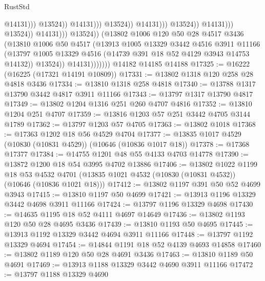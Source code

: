 \begin{lexlean}{RustStd}
\begin{coremodule}
                                                                  @14131)))
                                                            @13524))
                                                        @14131)))
                                                  @13524))
                                              @14131)))
                                        @13524))
                                    @14131)))
                              @13524))
                          @14131)))
                    @13524))
                (@13802
                  @1006
                  @120
                  @50
                  @28
                  @4517
                  @3436
                  (@13810
                    @1006
                    @50
                    @4517
                    (@13913
                      @1005
                      @13329
                      @3442
                      @4516
                      @3911
                      @11166
                      (@13797 @1005 @13329 @4516 (@14739 @391 @18 @52 @4129 @3943 @14753 @14132))
                      @13524))
                  @14131)))))))
    @14182
    @14185
    @14188
@17325 := @16222 (@16225 (@17321 @14191 @10809))
@17331 := @13802 @1318 @120 @258 @28 @4818 @3436
@17334 := @13810 @1318 @258 @4818
@17340 := @13788 @1317 @13790 @3442 @4817 @3911 @11166
@17343 := @13797 @1317 @13790 @4817
@17349 := @13802 @1204 @1316 @251 @260 @4707 @4816
@17352 := @13810 @1204 @251 @4707
@17359 := @13816 @1203 @57 @251 @3442 @4705 @3144 @1789
@17362 := @13797 @1203 @57 @4705
@17363 := @13802 @1018
@17368 := @17363 @1202 @18 @56 @4529 @4704
@17377 := @13835 @1017 @4529 (@10830 (@10831 @4529)) (@10646 (@10836 @1017 @18))
@17378 := @17368 @17377
@17384 := @14755 @1201 @48 @55 @4133 @4703 @14778
@17390 := @13872 @1200 @18 @54 @3995 @4702 @13886
@17406 := @13802
    @1022
    @1199
    @18
    @53
    @4532
    @4701
    (@13835 @1021 @4532 (@10830 (@10831 @4532)) (@10646 (@10836 @1021 @18)))
@17412 := @13802 @1197 @391 @50 @52 @4699 @3943
@17415 := @13810 @1197 @50 @4699
@17421 := @13913 @1196 @13329 @3442 @4698 @3911 @11166
@17424 := @13797 @1196 @13329 @4698
@17430 := @14635 @1195 @18 @52 @4111 @4697 @14649
@17436 := @13802 @1193 @120 @50 @28 @4695 @3436
@17439 := @13810 @1193 @50 @4695
@17445 := @13913 @1192 @13329 @3442 @4694 @3911 @11166
@17448 := @13797 @1192 @13329 @4694
@17454 := @14844 @1191 @18 @52 @4139 @4693 @14858
@17460 := @13802 @1189 @120 @50 @28 @4691 @3436
@17463 := @13810 @1189 @50 @4691
@17469 := @13913 @1188 @13329 @3442 @4690 @3911 @11166
@17472 := @13797 @1188 @13329 @4690

\end{coremodule}
\end{lexlean}
